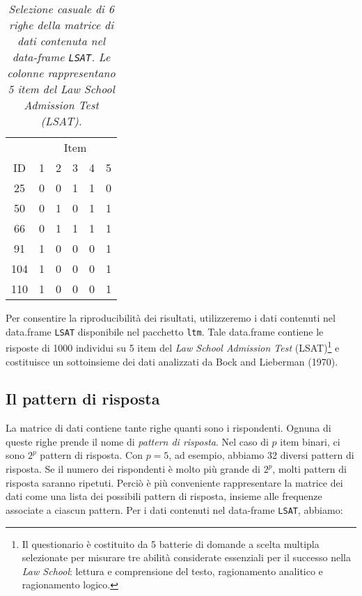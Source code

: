 \begin{table}[h!]
\caption{\textit{Selezione casuale di 6 righe della matrice di dati contenuta nel data-frame \texttt{LSAT}.  Le colonne rappresentano  5 item del  Law School Admission Test (LSAT).} }
\label{tab_dataLSAT}
\centering
\begin{tabular}{cccccc}
\toprule
&\multicolumn{5}{c}{Item} \\
\cmidrule(r){2-6}
ID &  1  &   2 &   3  &  4 & 5 \\
\midrule
25     &  0   &   0   &   1   &   1   &   0\\
50     &  0   &   1   &   0   &   1   &   1\\
66     &  0   &   1   &   1   &   1   &   1\\
91     &  1   &   0   &   0   &   0   &   1\\
104    &  1   &   0   &   0   &   0   &   1\\
110    &  1   &   0   &   0   &   0   &   1\\
\bottomrule
\end{tabular}
\end{table}

Per consentire la riproducibilità dei risultati, utilizzeremo i dati contenuti nel data.frame \texttt{LSAT} disponibile nel pacchetto \R\; \texttt{ltm}. 
Tale data.frame contiene le risposte di 1000 individui su 5 item del \emph{Law School Admission Test} (LSAT)\footnote{Il questionario è costituito da 5 batterie di domande a scelta multipla selezionate per misurare tre abilità considerate essenziali per il successo nella \textit{Law School}: lettura e comprensione del testo, ragionamento analitico e ragionamento logico.} e costituisce  un sottoinsieme dei dati analizzati da Bock and Lieberman (1970). 

\subsection{Il pattern di risposta}

La matrice di dati contiene tante righe quanti sono i rispondenti. 
Ognuna di queste righe prende il nome di \emph{pattern di risposta}. 
Nel caso di $p$ item binari, ci sono $2^p$ pattern di risposta.  
Con $p = 5$, ad esempio, abbiamo 32 diversi pattern di risposta. 
Se il numero dei rispondenti è molto più grande di $2^p$, molti pattern di risposta saranno ripetuti. 
Perciò è più conveniente rappresentare la matrice dei dati come una lista dei possibili pattern di risposta, insieme alle frequenze associate a ciascun pattern. 
Per i dati contenuti nel data-frame \texttt{LSAT}, abbiamo:

